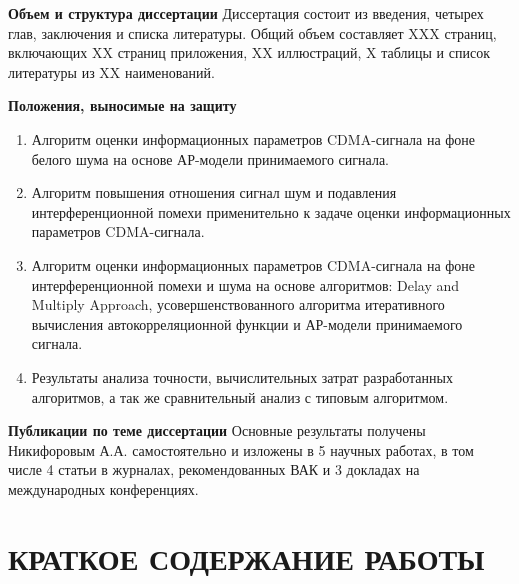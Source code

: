 {\bf{Объем и структура диссертации}}
Диссертация состоит из введения, четырех глав, заключения и списка литературы. Общий объем составляет XXX страниц, включающих XX страниц приложения, XX иллюстраций,
X таблицы и список литературы из XX наименований.

{\bf{Положения, выносимые на защиту}}
\begin{enumerate}
	\item {Алгоритм оценки информационных параметров CDMA-сигнала на фоне белого шума на основе АР-модели принимаемого сигнала.}
	\item {Алгоритм повышения отношения сигнал шум и подавления интерференционной помехи применительно к задаче оценки информационных параметров CDMA-сигнала.}
	\item {Алгоритм оценки информационных параметров CDMA-сигнала на фоне интерференционной помехи и шума на основе алгоритмов: Delay and Multiply Approach,
		усовершенствованного алгоритма итеративного вычисления автокорреляционной функции и АР-модели принимаемого сигнала.}
	\item {Результаты анализа точности, вычислительных затрат разработанных алгоритмов, а так же сравнительный анализ с типовым алгоритмом.}
\end{enumerate}

{\bf{Публикации по теме диссертации}}
Основные результаты получены Никифоровым А.А. самостоятельно и изложены в 5 научных работах, в том числе 4 статьи в журналах, рекомендованных ВАК и
3 докладах на международных конференциях.


%



{\center\section*{КРАТКОЕ СОДЕРЖАНИЕ РАБОТЫ}}








\newpage
